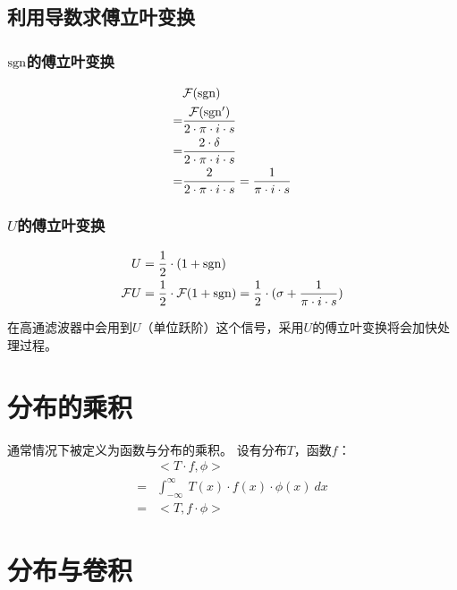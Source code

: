 \subsection{利用导数求傅立叶变换}
\subsubsection {$\operatorname{sgn}$的傅立叶变换}
\begin{align*}
	  & \mathcal{F}(\operatorname{sgn})                                             \\
	= & \frac{\mathcal{F}(\operatorname{sgn}')}{2\cdot\pi\cdot i\cdot s}            \\
	= & \frac{2\cdot \delta}{2\cdot\pi\cdot i\cdot s}                 \\
	= & \frac{2}{2\cdot\pi\cdot i\cdot s}=\frac{1}{\pi\cdot i\cdot s} \\
\end{align*}
\subsubsection {$U$的傅立叶变换}
\begin{align*}
	U            & =\frac{1}{2}\cdot(1+\operatorname{sgn})                                                                  \\
	\mathcal{F}U & =\frac{1}{2}\cdot \mathcal{F}(1+\operatorname{sgn})=\frac{1}{2}\cdot(\sigma+\frac{1}{\pi\cdot i\cdot s})
\end{align*}

在高通滤波器中会用到$U$（单位跃阶）这个信号，采用$U$的傅立叶变换将会加快处理过程。




\section{分布的乘积}
通常情况下被定义为函数与分布的乘积。
设有分布$T$，函数$f$：
\begin{align*}
	  & <T\cdot f,\phi>                                          \\
	= & \int_{-\infty}^{\infty}\ T(x)\cdot f(x)\cdot \phi(x)\ dx \\
	= & <T,f\cdot \phi>
\end{align*}
\section{分布与卷积}
